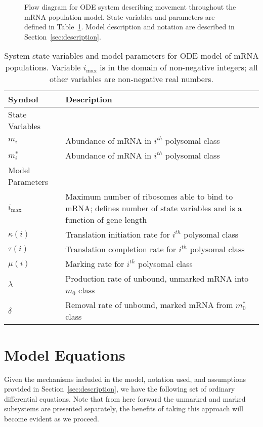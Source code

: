 \documentclass[review]{elsarticle}
\newcommand{\imax}{\ensuremath{i_{\max}}\xspace}
\begin{document}
\begin{figure} [htbp]
\begin{framed}
\begin{tikzpicture}[every node/.style={rectangle,fill=white,node distance=16ex, scale=0.75}, scale=0.90]
	\end{tikzpicture}
	\caption{Flow diagram for ODE system describing movement throughout the mRNA population model.
State variables and parameters are defined in Table~\ref{tab:params}.
Model description and notation are described in Section~\ref{sec:description}.}
	\label{fig:flow_diagram}
	\end{framed}
\end{figure}

\begin{table}
\centering
\begin{tabular}{|p{75pt} l|}\hline
\textbf{Symbol}&\textbf{Description}\\ \hline\hline
State Variables & \\ \hline
$m_i$ & Abundance of mRNA in $i^{th}$ polysomal class \\
$m_i^*$ & Abundance of mRNA in $i^{th}$ polysomal class \\ \hline
Model Parameters & \\ \hline
\imax & Maximum number of ribosomes able to bind to mRNA; defines number of state variables and is a function of gene length \\
$\kappa(i)$ & Translation initiation rate for $i^{th}$ polysomal class \\
$\tau(i)$ & Translation completion rate for $i^{th}$ polysomal class \\
$\mu(i)$ & Marking rate for $i^{th}$ polysomal class\\
$\lambda$ & Production rate of unbound, unmarked mRNA into $m_0$ class\\
$\delta$ & Removal rate of unbound, marked mRNA from $m_0^*$ class\\ \hline \hline
\end{tabular}
\caption{System state variables and model parameters for ODE model of mRNA populations.
Variable \imax is in the domain of non-negative integers; all other variables are non-negative real numbers.}
\label{tab:params}
\end{table}

\section{Model Equations}
Given the mechanisms included in the model, notation used, and assumptions provided in Section~\ref{sec:description}, we have the following set of ordinary differential equations.
Note that from here forward the unmarked and marked subsystems are presented separately, the benefits of taking this approach will become evident as we proceed.  
\end{document}

